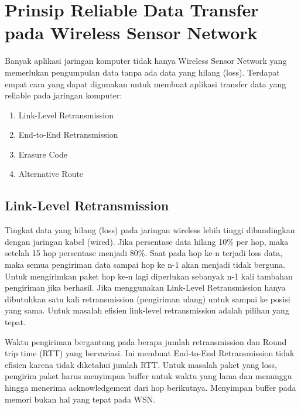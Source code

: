 \section{Prinsip Reliable Data Transfer pada Wireless Sensor Network}
\label{sec:reliable}
Banyak aplikasi jaringan komputer tidak hanya Wireless Sensor Network yang memerlukan pengumpulan data tanpa ada data yang hilang (loss). Terdapat empat cara yang dapat digunakan untuk membuat aplikasi transfer data yang reliable pada jaringan komputer:
\begin{enumerate}
	\item Link-Level Retransmission
	\item End-to-End Retransmission
	\item Erasure Code
	\item Alternative Route
\end{enumerate}

\subsection{Link-Level Retransmission}
Tingkat data yang hilang (loss) pada jaringan wireless lebih tinggi dibandingkan dengan jaringan kabel (wired). Jika persentase data hilang 10\% per hop, maka setelah 15 hop persentase menjadi 80\%. Saat pada hop ke-n terjadi loss data, maka semua pengiriman data sampai hop ke n-1 akan menjadi tidak berguna. Untuk mengirimkan paket hop ke-n lagi diperlukan sebanyak n-1 kali tambahan pengiriman jika berhasil. Jika menggunakan Link-Level Retransmission hanya dibutuhkan satu kali retransmission (pengiriman ulang) untuk sampai ke posisi yang sama. Untuk masalah efisien link-level retransmission adalah pilihan yang tepat.

Waktu pengiriman bergantung pada berapa jumlah retransmission dan Round trip time (RTT) yang bervariasi. Ini membuat End-to-End Retransmission tidak efisien karena tidak diketahui jumlah RTT. Untuk masalah paket yang loss, pengirim paket harus menyimpan buffer untuk waktu yang lama dan menunggu hingga menerima acknowledgement dari hop berikutnya. Menyimpan buffer pada memori bukan hal yang tepat pada WSN.

